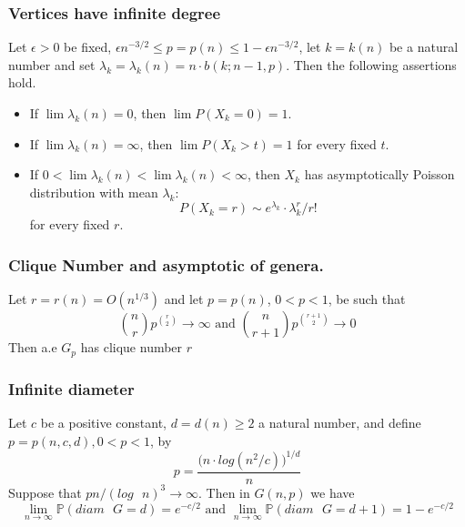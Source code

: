 \documentclass[handout]{beamer}
\theoremstyle{plain}
\renewcommand{\P}{\mathbb{P}}
\begin{document}
\begin{frame}
\frametitle{Vertices have  infinite  degree}
\begin{theorem}
Let $\epsilon>0$ be fixed, $\epsilon n^{-3/2} \leq p = p(n) \leq 1 - \epsilon n^{-3/2}$, let $k = k(n)$ be a natural number and set $\lambda_{k} = \lambda_{k}(n) = n\cdot b(k;n - 1,p)$. Then the following assertions hold.

\begin{itemize}
\item If $\lim \lambda_{k}(n) = 0$, then $\lim P(X_{k} = 0) = 1$. 
\item If $\lim \lambda_{k}(n) = \infty$, then $\lim P(X_{k} > t) = 1$
for every fixed $t$.
\item If $0 < \lim\lambda_{k}(n) < \lim \lambda_{k}(n) < \infty$,
then $X_{k}$ has asymptotically Poisson distribution with mean $\lambda_{k}$: 
$$P(X_{k} = r) \sim e^{\lambda_{k}}\cdot \lambda_{k}^{r}/ r!$$
for every fixed $r$.
\end{itemize}
\end{theorem}
\end{frame}

\begin{frame}

\frametitle{Clique Number  and asymptotic  of  genera.}
\begin{theorem}
Let $r = r(n) = O(n^{1/3})$ and let $p=p(n)$, $0<p<1$, be such that
$$\binom{n}{r} p^{\binom{r}{2}} \to \infty \text{ and } \binom{n}{r+1} p^{\binom{r+1}{2}} \to 0 $$
Then a.e $G_{p}$ has clique number $r$
\end{theorem}
\end{frame}

\begin{frame}\frametitle{Infinite  diameter}
\begin{theorem}
Let $c$ be a positive constant, $d=d(n)\geq 2$ a natural number, and define $p=p(n,c,d), 0<p<1$, by
$$p = \frac{\big( n\cdot log(n^2/c)\big) ^{1/d}}{n}$$
Suppose that $pn/(log\text{ }n)^{3} \to \infty$. Then in $G(n,p)$ we have
$$\lim_{n\to \infty} \P (diam\text{ }G = d) = e^{-c/2} \text{ and }  \lim_{n\to \infty} \P (diam\text{ }G = d+1) = 1 - e^{-c/2}$$
\end{theorem}
\end{frame}
\end{document}
